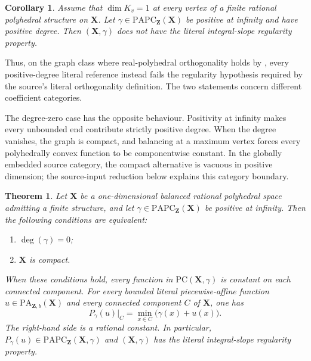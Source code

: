 \documentclass[11pt,a4paper]{article}
\newtheorem{theorem}{Theorem}[section]
\newtheorem{corollary}[corollary]{Corollary}
\theoremstyle{definition}
\theoremstyle{remark}
\begin{document}
\begin{corollary}
\label{cor:frontier-polyhedral-rank-one-graph-integral-nonregularity}
Assume that $\dim K_v=1$ at every vertex of a finite rational polyhedral
structure on $\mathbf X$.  Let
$\gamma\in\mathrm{PAPC}_{\mathbf Z}(\mathbf X)$ be positive at infinity
and have positive degree.  Then $(\mathbf X,\gamma)$ does not have the
literal integral-slope regularity property.
\end{corollary}

Thus, on the graph class where real-polyhedral orthogonality holds by
, every
positive-degree literal reference instead fails the regularity hypothesis
required by the source's literal orthogonality definition.  The two
statements concern different coefficient categories.








The degree-zero case has the opposite behaviour.  Positivity at infinity
makes every unbounded end contribute strictly positive degree.  When the
degree vanishes, the graph is compact, and balancing at a maximum vertex
forces every polyhedrally convex function to be componentwise constant.
In the globally embedded source category, the compact alternative is
vacuous in positive dimension; the source-input reduction below explains
this category boundary.



\begin{theorem}
\label{thm:frontier-polyhedral-zero-degree-integral-regularity}
Let $\mathbf X$ be a one-dimensional balanced rational polyhedral space
admitting a finite structure, and let
$\gamma\in\mathrm{PAPC}_{\mathbf Z}(\mathbf X)$ be positive at infinity.
Then the following conditions are equivalent:
\begin{enumerate}
\item $\deg(\gamma)=0$;
\item $\mathbf X$ is compact.
\end{enumerate}
When these conditions hold, every function in
$\mathrm{PC}(\mathbf X,\gamma)$ is constant on each connected component.
For every bounded literal piecewise-affine function
$u\in\mathrm{PA}_{\mathbf Z,b}(\mathbf X)$ and every connected component
$C$ of $\mathbf X$, one has
\begin{equation}
 P_\gamma(u)|_C
   =\min_{x\in C}\bigl(\gamma(x)+u(x)\bigr).
 \label{eq:frontier-polyhedral-zero-degree-envelope}
\end{equation}
The right-hand side is a rational constant.  In particular,
$P_\gamma(u)\in\mathrm{PAPC}_{\mathbf Z}(\mathbf X,\gamma)$ and
$(\mathbf X,\gamma)$ has the literal integral-slope regularity property.
\end{theorem}
\end{document}
